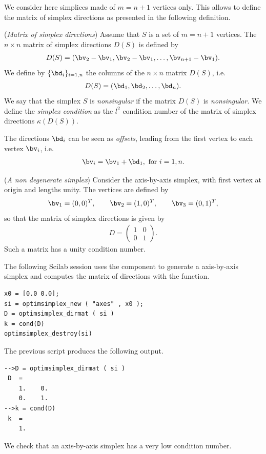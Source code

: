 We consider here simplices made of $m=n+1$ vertices only.
This allows to define the matrix of simplex directions as presented
in the following definition.

\begin{definition}
(\emph{Matrix of simplex directions})
Assume that $S$ is a set of $m=n+1$ vertices. The $n\times n$ matrix of 
simplex directions $D(S)$ is defined by 
\begin{eqnarray}
D(S) = (\bv_2 - \bv_1 , \bv_2-\bv_1,\ldots,\bv_{n+1} - \bv_1).
\end{eqnarray}
We define by $\{\bd_i\}_{i=1,n}$ the columns of the $n \times n$ matrix $D(S)$,
i.e.
\begin{eqnarray}
D(S)= (\bd_1,\bd_2,\ldots,\bd_n).
\end{eqnarray}
We say that the simplex $S$ is \emph{nonsingular} if the matrix $D(S)$ is \emph{nonsingular}.
We define the \emph{simplex condition} as the $l^2$ condition number 
of the matrix of simplex directions $\kappa(D(S))$.
\end{definition}

The directions $\bd_i$ can be seen as \emph{offsets}, leading from
the first vertex to each vertex $\bv_i$, i.e.
\begin{eqnarray}
\bv_i = \bv_1 + \bd_1, \textrm{ for } i = 1, n.
\end{eqnarray}

\begin{example}
(\emph{A non degenerate simplex})
Consider the axis-by-axis simplex, with first vertex at origin and 
lengths unity. The vertices are defined by 
\begin{eqnarray}
\bv_1=(0,0)^T, \qquad \bv_2=(1,0)^T, \qquad \bv_3=(0,1)^T,
\end{eqnarray}
so that the matrix of simplex directions is 
given by 
\begin{eqnarray}
D = \left(
\begin{array}{cc}
1 & 0 \\
0 & 1 
\end{array}
\right).
\end{eqnarray}
Such a matrix has a unity condition number.

The following Scilab session uses the 
component to generate a axis-by-axis simplex and computes the 
matrix of directions with the 
function.
\lstset{language=scilabscript}
\begin{lstlisting}
x0 = [0.0 0.0];
si = optimsimplex_new ( "axes" , x0 );
D = optimsimplex_dirmat ( si )
k = cond(D)
optimsimplex_destroy(si)
\end{lstlisting}
The previous script produces the following output.
\lstset{language=scilabscript}
\begin{lstlisting}
-->D = optimsimplex_dirmat ( si )
 D  =
    1.    0.  
    0.    1.  
-->k = cond(D)
 k  =
    1.  
\end{lstlisting}
We check that an axis-by-axis simplex has a very low 
condition number.
\end{example}

